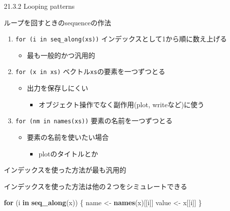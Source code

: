 \documentclass[ignorenonframetext,]{beamer}
\newenvironment{Shaded}{\begin{snugshade}}{\end{snugshade}}
\newcommand{\KeywordTok}[1]{\textcolor[rgb]{0.13,0.29,0.53}{\textbf{#1}}}
\newcommand{\StringTok}[1]{\textcolor[rgb]{0.31,0.60,0.02}{#1}}
\newcommand{\ControlFlowTok}[1]{\textcolor[rgb]{0.13,0.29,0.53}{\textbf{#1}}}
\newcommand{\NormalTok}[1]{#1}
\providecommand{\tightlist}{%
  \setlength{\itemsep}{0pt}\setlength{\parskip}{0pt}}
\begin{document}
\begin{frame}[fragile]{21.3.2 Looping patterns}

ループを回すときのsequenceの作法

\begin{enumerate}
\def\labelenumi{\arabic{enumi}.}
\tightlist
\item
  \texttt{for\ (i\ in\ seq\_along(xs))}
  インデックスとして1から順に数え上げる

  \begin{itemize}
  \tightlist
  \item
    最も一般的かつ汎用的
  \end{itemize}
\item
  \texttt{for\ (x\ in\ xs)} ベクトル\texttt{xs}の要素を一つずつとる

  \begin{itemize}
  \tightlist
  \item
    出力を保存しにくい

    \begin{itemize}
    \tightlist
    \item
      オブジェクト操作でなく副作用(plot, writeなど)に使う
    \end{itemize}
  \end{itemize}
\item
  \texttt{for\ (nm\ in\ names(xs))} 要素の名前を一つずつとる

  \begin{itemize}
  \tightlist
  \item
    要素の名前を使いたい場合

    \begin{itemize}
    \tightlist
    \item
      plotのタイトルとか
    \end{itemize}
  \end{itemize}
\end{enumerate}

\end{frame}

\begin{frame}[fragile]{インデックスを使った方法が最も汎用的}

インデックスを使った方法は他の２つをシミュレートできる

\begin{Shaded}
\begin{Highlighting}[]
\ControlFlowTok{for}\NormalTok{ (i }\ControlFlowTok{in} \KeywordTok{seq_along}\NormalTok{(x)) \{}
\NormalTok{  name <-}\StringTok{ }\KeywordTok{names}\NormalTok{(x)[[i]]}
\NormalTok{  value <-}\StringTok{ }\NormalTok{x[[i]]}
\NormalTok{\}}
\end{Highlighting}
\end{Shaded}

\end{frame}
\end{document}
